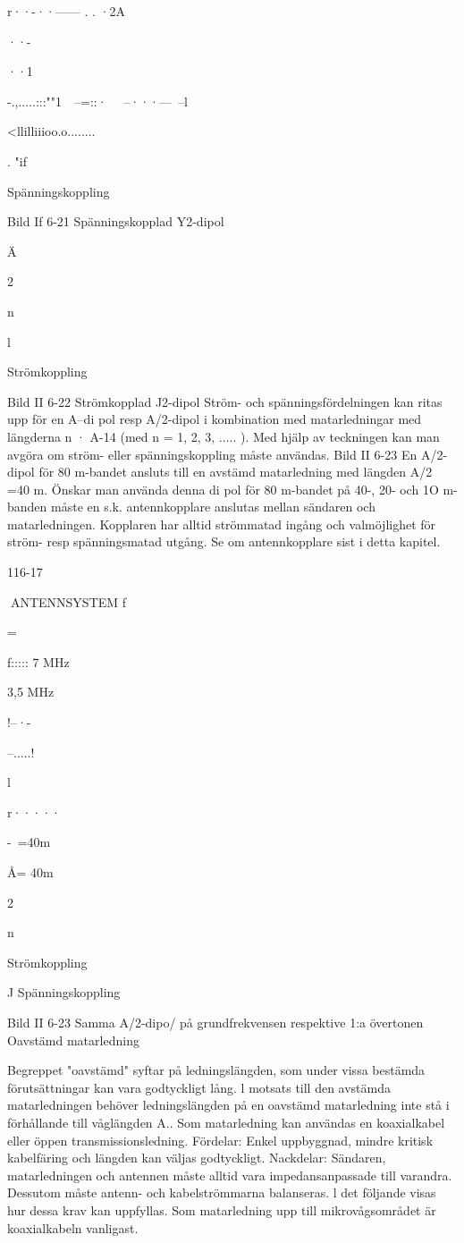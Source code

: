 {{r··-··------ . . ·2A

··-

··1

-.,.....:::""1~~--=::·~ ~--···---~--l

<llilliiioo.o........

. "if

Spänningskoppling

Bild If 6-21 Spänningskopplad Y2-dipol

Ä

2

n

l

Strömkoppling

Bild II 6-22 Strömkopplad J2-dipol
Ström- och spänningsfördelningen kan
ritas upp för en A--di pol resp A/2-dipol i kombination med matarledningar med längderna
n · A-14 (med n = 1, 2, 3, ..... ). Med hjälp av
teckningen kan man avgöra om ström- eller
spänningskoppling måste användas.
Bild II 6-23
En A/2-dipol för 80 m-bandet ansluts till
en avstämd matarledning med längden A/2
=40 m.
Önskar man använda denna di pol för 80
m-bandet på 40-, 20- och 1O m-banden
måste en s.k. antennkopplare anslutas mellan sändaren och matarledningen. Kopplaren har alltid strömmatad ingång och valmöjlighet för ström- resp spänningsmatad
utgång. Se om antennkopplare sist i detta
kapitel.

116-17

ANTENNSYSTEM
f

=

f::::: 7 MHz

3,5 MHz

!--·-

--.....!

l

r·····

-~=40m

Å= 40m

2

n

Strömkoppling

J
Spänningskoppling

Bild II 6-23 Samma A/2-dipo/ på grundfrekvensen respektive 1:a övertonen
Oavstämd matarledning

Begreppet "oavstämd" syftar på ledningslängden, som under vissa bestämda förutsättningar kan vara godtyckligt lång. l motsats till den avstämda matarledningen behöver ledningslängden på en oavstämd matarledning inte stå i förhållande till våglängden A.. Som matarledning kan användas en
koaxialkabel eller öppen transmissionsledning.
Fördelar: Enkel uppbyggnad, mindre kritisk kabelfäring och längden kan väljas godtyckligt.
Nackdelar: Sändaren, matarledningen
och antennen måste alltid vara impedansanpassade till varandra. Dessutom måste
antenn- och kabelströmmarna balanseras. l
det följande visas hur dessa krav kan uppfyllas.
Som matarledning upp till mikrovågsområdet är koaxialkabeln vanligast.

}}
